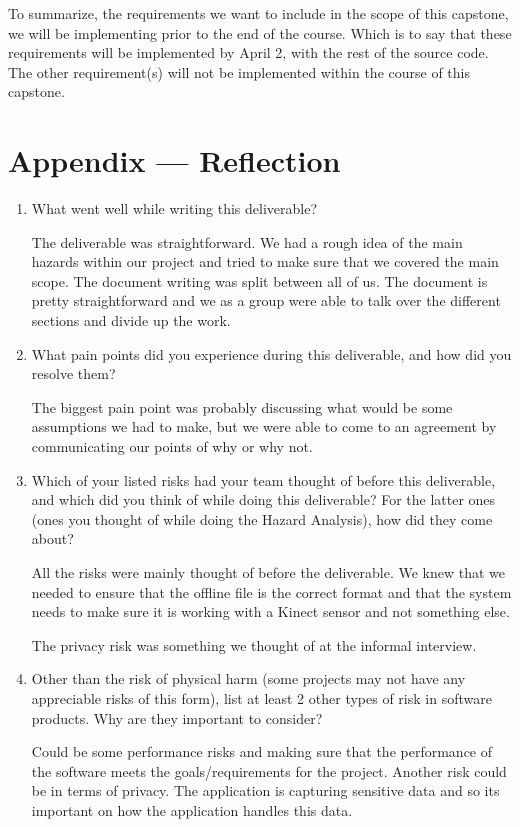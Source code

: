 \documentclass{article}
\begin{document}
To summarize, the requirements we want to include in the scope of this capstone, we will be implementing prior to the end of the course. Which is to say 
that these requirements will be implemented by April 2, with the rest of the source code. The other requirement(s) will not be implemented within the course of this capstone.



\newpage{}

\section*{Appendix --- Reflection}

\begin{enumerate}
    \item What went well while writing this deliverable? 

The deliverable was straightforward. We had a rough idea of the main hazards within our project and 
tried to make sure that we covered the main scope. The document writing was split between all of us.
The document is pretty straightforward and we as a group were able to talk over the different sections
and divide up the work.

\item What pain points did you experience during this deliverable, and how
did you resolve them?

The biggest pain point was probably discussing what would be some assumptions we had to make, but we were able to come to an agreement by communicating our points of why or why not.

\item Which of your listed risks had your team thought of before this
deliverable, and which did you think of while doing this deliverable? For
the latter ones (ones you thought of while doing the Hazard Analysis), how
did they come about?

All the risks were mainly thought of before the deliverable. We knew that we needed to ensure that the 
offline file is the correct format and that the system needs to make sure it is working with a Kinect sensor and not something else.

The privacy risk was something we thought of at the informal interview.

\item Other than the risk of physical harm (some projects may not have any
appreciable risks of this form), list at least 2 other types of risk in
software products. Why are they important to consider?

Could be some performance risks and making sure that the performance of the software meets the goals/requirements for the project.
Another risk could be in terms of privacy. The application is capturing sensitive data and so its important on how the application handles this data.

\end{enumerate}
\end{document}

